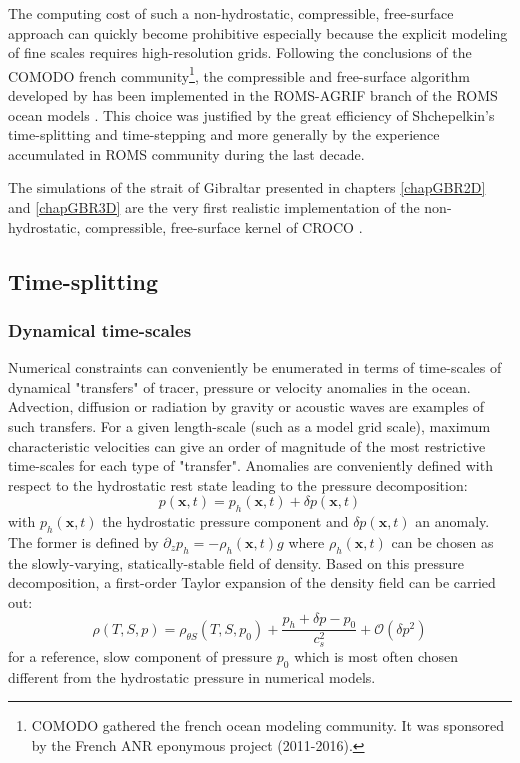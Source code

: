 The computing cost of such a non-hydrostatic, compressible, free-surface approach can quickly become prohibitive especially because the explicit modeling of fine scales requires high-resolution grids. Following the conclusions of the COMODO french community\footnote{COMODO gathered the french ocean modeling community. It was sponsored by the French ANR eponymous project (2011-2016).}, the compressible and free-surface algorithm developed by \cite{auclair_non-hydrostatic_2018} has been implemented in the ROMS-AGRIF branch of the ROMS ocean models \citep{shchepetkin_regional_2005}. This choice was justified by the great efficiency of Shchepelkin's time-splitting and time-stepping and more generally by the experience accumulated in ROMS community during the last decade.

The simulations of the strait of Gibraltar presented in chapters \ref{chapGBR2D} and \ref{chapGBR3D} are the very first realistic implementation of the non-hydrostatic, compressible, free-surface kernel of CROCO \citep{hilt_numerical_2020}.
\color{black}
\subsection{Time-splitting}
\subsubsection{Dynamical time-scales}
Numerical constraints can conveniently be enumerated in terms of time-scales of dynamical "transfers" of tracer, pressure or velocity anomalies in the ocean. Advection, diffusion or radiation by gravity or acoustic waves are examples of such transfers. For a given length-scale (such as a model grid scale), maximum characteristic velocities can give an order of magnitude of the most restrictive time-scales for each type of "transfer". Anomalies are conveniently defined with respect to the hydrostatic rest state leading to the pressure decomposition:
\begin{equation}
	\displaystyle
	\label{decompoP_0}
	p(\mathbf{x},t)=p_h(\mathbf{x},t)+\delta p(\mathbf{x},t)
\end{equation}
with $p_h(\mathbf{x},t)$ the hydrostatic pressure component and $\delta p(\mathbf{x},t)$ an anomaly. The former is defined by $\partial_z p_h=-\rho_h(\mathbf{x},t) g$ where $\rho_h(\mathbf{x},t)$ can be chosen as the slowly-varying, statically-stable field of density. Based on this pressure decomposition, a first-order Taylor expansion of the density field can be carried out:
\begin{equation}
  \displaystyle 
	\label{decompor_0}
  \rho(T,S,p)=\rho_{\theta S}(T,S,p_0)+\frac{p_h+\delta p-p_0}{c_s^2}+\mathcal{O}(\delta p^2)
\end{equation}
for a reference, slow component of pressure $p_0$ which is most often chosen different from the hydrostatic pressure in numerical models.

